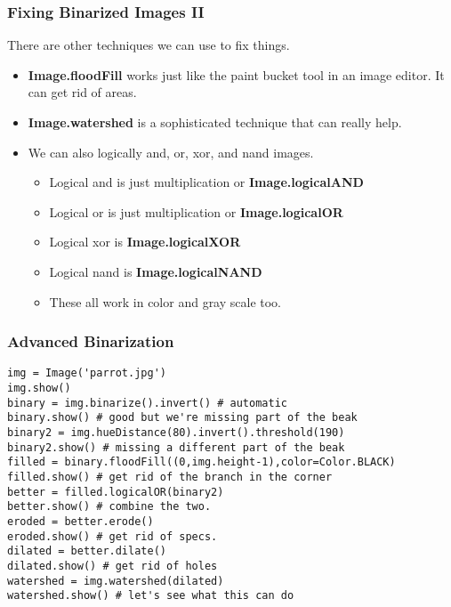 \documentclass[compress]{beamer}
\begin{document}
\begin{frame}
  \frametitle{Fixing Binarized Images II }

There are other techniques we can use to fix things. 
\begin{itemize}
\item \textbf{Image.floodFill} works just like the paint bucket tool
  in an image editor. It can get rid of areas.
\item \textbf{Image.watershed} is a sophisticated technique that can
  really help.
\item We can also logically and, or, xor, and nand images. 
  \begin{itemize}
  \item Logical and is just multiplication or \textbf{Image.logicalAND} 
  \item Logical or is just multiplication or \textbf{Image.logicalOR} 
  \item Logical xor is \textbf{Image.logicalXOR} 
  \item Logical nand is \textbf{Image.logicalNAND}
  \item These all work in color and gray scale too.
  \end{itemize}
\end{itemize}
\end{frame}
\begin{frame}[fragile] 
\frametitle{Advanced Binarization}
\begin{example}
\begin{verbatim}
img = Image('parrot.jpg')
img.show()
binary = img.binarize().invert() # automatic
binary.show() # good but we're missing part of the beak
binary2 = img.hueDistance(80).invert().threshold(190)
binary2.show() # missing a different part of the beak
filled = binary.floodFill((0,img.height-1),color=Color.BLACK)
filled.show() # get rid of the branch in the corner
better = filled.logicalOR(binary2)
better.show() # combine the two.
eroded = better.erode()
eroded.show() # get rid of specs.
dilated = better.dilate()
dilated.show() # get rid of holes
watershed = img.watershed(dilated)
watershed.show() # let's see what this can do
\end{verbatim}
\end{example}
\end{frame}

\end{document}
